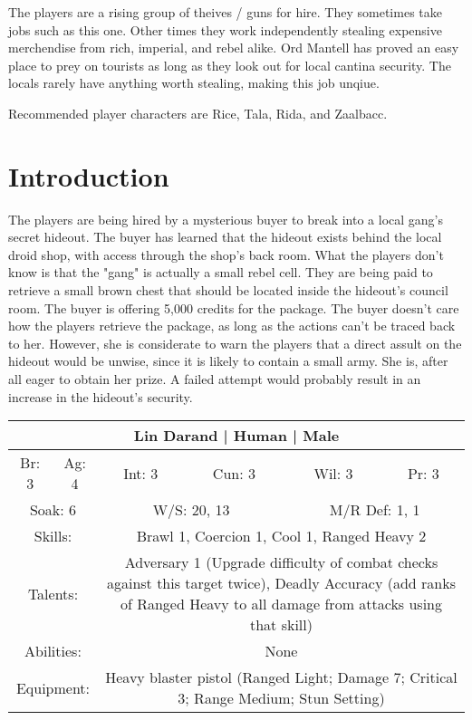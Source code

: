 \documentclass[letterpaper]{article}
\begin{document}
The players are a rising group of theives / guns for hire. They sometimes take jobs such as this one. Other times they work independently stealing expensive merchendise from rich, imperial, and rebel alike. Ord Mantell has proved an easy place to prey on tourists as long as they look out for local cantina security. The locals rarely have anything worth stealing, making this job unqiue.

Recommended player characters are Rice, Tala, Rida, and Zaalbacc.

\section{Introduction}

The players are being hired by a mysterious buyer to break into a local gang's secret hideout. The buyer has learned that the hideout exists behind the local droid shop, with access through the shop's back room. What the players don't know is that the "gang" is actually a small rebel cell. They are being paid to retrieve a small brown chest that should be located inside the hideout's council room. The buyer is offering 5,000 credits for the package. The buyer doesn't care how the players retrieve the package, as long as the actions can't be traced back to her. However, she is considerate to warn the players that a direct assult on the hideout would be unwise, since it is likely to contain a small army. She is, after all eager to obtain her prize. A failed attempt would probably result in an increase in the hideout's security.

\begin{center}
\begin{tabular}{| c c c c c c |}
    \hline
    \multicolumn{6}{|c|}{Lin Darand | Human | Male} \\
    \hline
    Br: 3 & Ag: 4 & Int: 3 & Cun: 3 & Wil: 3 & Pr: 3 \\[2mm]
    \multicolumn{2}{|c}{Soak: 6} & \multicolumn{2}{c}{W/S: 20, 13} & \multicolumn{2}{c|}{M/R Def: 1, 1} \\
    \hline
    \multicolumn{2}{|c}{Skills:} & \multicolumn{4}{p{5cm}|}{Brawl 1, Coercion 1, Cool 1, Ranged Heavy 2} \\
    \multicolumn{2}{|c}{Talents:} & \multicolumn{4}{p{5cm}|}{Adversary 1 (Upgrade difficulty of combat checks against this target twice), Deadly Accuracy (add ranks of Ranged Heavy to all damage from attacks using that skill)} \\
    \multicolumn{2}{|c}{Abilities:} & \multicolumn{4}{p{5cm}|}{None} \\
    \multicolumn{2}{|c}{Equipment:} & \multicolumn{4}{p{5cm}|}{Heavy blaster pistol (Ranged Light; Damage 7; Critical 3; Range Medium; Stun Setting)} \\
    \hline
\end{tabular}
\end{center}
\end{document}
